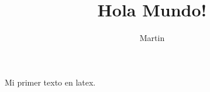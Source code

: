 \documentclass[a4,11pt]{article}
\title{Hola Mundo!}
\author{Martin}
\begin{document}
\maketitle
Mi primer texto en latex.
\end{document}
